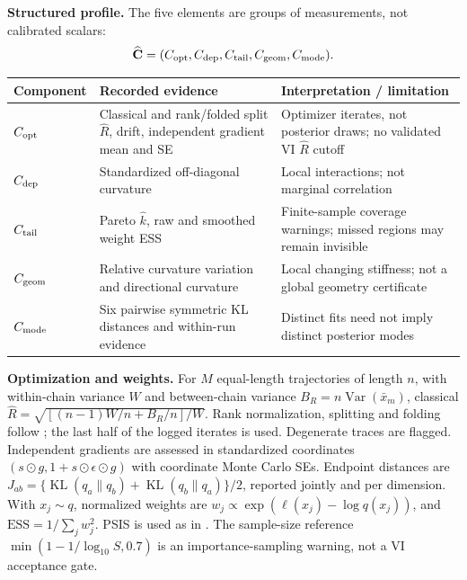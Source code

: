 \documentclass[11pt,a4paper]{article}
\newcommand{\KL}{\operatorname{KL}}
\begin{document}
\textbf{Structured profile.} The five elements are groups of measurements, not calibrated scalars:
\[\widehat{\mathbf C}=(C_{\rm opt},C_{\rm dep},C_{\rm tail},C_{\rm geom},C_{\rm mode}).\]
\begin{center}\small
\begin{tabular}{p{22mm}p{67mm}p{66mm}}
\toprule Component & Recorded evidence & Interpretation / limitation \\\midrule
$C_{\rm opt}$ & Classical and rank/folded split $\hat R$, drift, independent gradient mean and SE & Optimizer iterates, not posterior draws; no validated VI $\hat R$ cutoff \\
$C_{\rm dep}$ & Standardized off-diagonal curvature & Local interactions; not marginal correlation \\
$C_{\rm tail}$ & Pareto $\hat k$, raw and smoothed weight ESS & Finite-sample coverage warnings; missed regions may remain invisible \\
$C_{\rm geom}$ & Relative curvature variation and directional curvature & Local changing stiffness; not a global geometry certificate \\
$C_{\rm mode}$ & Six pairwise symmetric KL distances and within-run evidence & Distinct fits need not imply distinct posterior modes \\\bottomrule
\end{tabular}
\end{center}
\textbf{Optimization and weights.} For $M$ equal-length trajectories of length $n$, with within-chain variance $W$ and between-chain variance $B_R=n\operatorname{Var}(\bar x_m)$, classical $\hat R=\sqrt{[(n-1)W/n+B_R/n]/W}$. Rank normalization, splitting and folding follow \cite{vehtari21}; the last half of the logged iterates is used. Degenerate traces are flagged. Independent gradients are assessed in standardized coordinates $(s\odot g,1+s\odot\epsilon\odot g)$ with coordinate Monte Carlo SEs. Endpoint distances are $J_{ab}=\{\KL(q_a\|q_b)+\KL(q_b\|q_a)\}/2$, reported jointly and per dimension. With $x_j\sim q$, normalized weights are $w_j\propto\exp(\ell(x_j)-\log q(x_j))$, and $\mathrm{ESS}=1/\sum_j w_j^2$. PSIS is used as in \cite{yao18,vehtari24}. The sample-size reference $\min(1-1/\log_{10}S,0.7)$ is an importance-sampling warning, not a VI acceptance gate.
\end{document}
